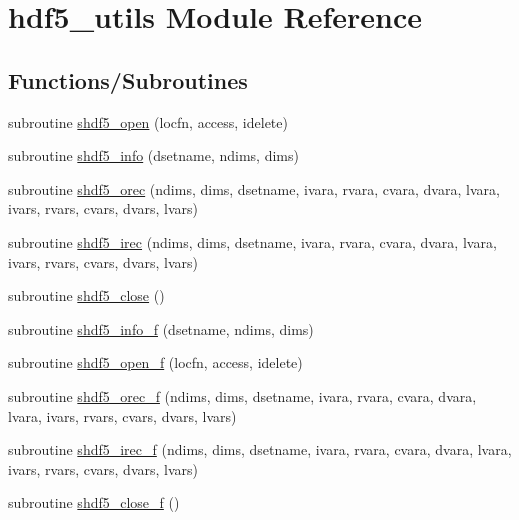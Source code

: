 \hypertarget{namespacehdf5__utils}{}\section{hdf5\+\_\+utils Module Reference}
\label{namespacehdf5__utils}
\subsection*{Functions/\+Subroutines}
\begin{DoxyCompactItemize}
\item 
subroutine \hyperlink{namespacehdf5__utils_a8324e53f06756f48c91f3735f9d26640}{shdf5\+\_\+open} (locfn, access, idelete)
\item 
subroutine \hyperlink{namespacehdf5__utils_a5dbfd8881a533f6a96e2fe24a26b41e7}{shdf5\+\_\+info} (dsetname, ndims, dims)
\item 
subroutine \hyperlink{namespacehdf5__utils_a58ff5ab2483e4daa0dbed83d77252b07}{shdf5\+\_\+orec} (ndims, dims, dsetname, ivara, rvara, cvara, dvara, lvara, ivars, rvars, cvars, dvars, lvars)
\item 
subroutine \hyperlink{namespacehdf5__utils_ab26ed9a2b6aaa85020cd040ea3b049fc}{shdf5\+\_\+irec} (ndims, dims, dsetname, ivara, rvara, cvara, dvara, lvara, ivars, rvars, cvars, dvars, lvars)
\item 
subroutine \hyperlink{namespacehdf5__utils_ac2a5ad4876fe382625c40cd9964ca3c1}{shdf5\+\_\+close} ()
\item 
subroutine \hyperlink{namespacehdf5__utils_a5149c551d73478f502b8660e3bdbd5b8}{shdf5\+\_\+info\+\_\+f} (dsetname, ndims, dims)
\item 
subroutine \hyperlink{namespacehdf5__utils_ab621eee22271edfd3bf37b44d5b657e6}{shdf5\+\_\+open\+\_\+f} (locfn, access, idelete)
\item 
subroutine \hyperlink{namespacehdf5__utils_a2ede1f04f554f0906040f2802b2ccbd3}{shdf5\+\_\+orec\+\_\+f} (ndims, dims, dsetname, ivara, rvara, cvara, dvara, lvara, ivars, rvars, cvars, dvars, lvars)
\item 
subroutine \hyperlink{namespacehdf5__utils_a84928db7f00b3aedc24a2c20281dddb1}{shdf5\+\_\+irec\+\_\+f} (ndims, dims, dsetname, ivara, rvara, cvara, dvara, lvara, ivars, rvars, cvars, dvars, lvars)
\item 
subroutine \hyperlink{namespacehdf5__utils_aced9a0b34d2b1e59a1867be622a7c8a4}{shdf5\+\_\+close\+\_\+f} ()
\end{DoxyCompactItemize}


